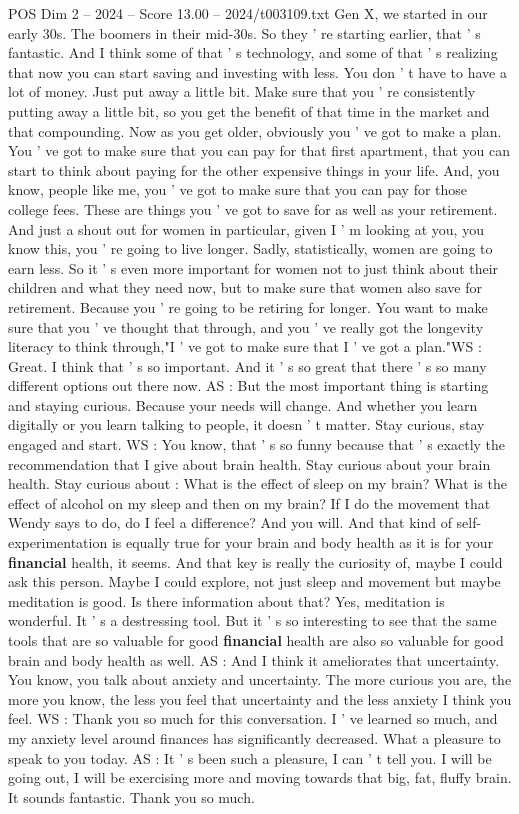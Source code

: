 \begin{textsample}{POS Dim 2 – 2024 – Score 13.00 – 2024/t003109.txt}
Gen X, we started in our early 30s.
The boomers in their mid-30s.
So they ' re starting earlier, that ' s fantastic.
And I think some of that ' s technology, and some of that ' s realizing that now you can start saving and investing with less.
You don ' t have to have a lot of money.
Just put away a little bit.
Make sure that you ' re consistently putting away a little bit, so you get the benefit of that time in the market and that compounding.
Now as you get older, obviously you ' ve got to make a plan.
You ' ve got to make sure that you can pay for that first apartment, that you can start to think about paying for the other expensive things in your life.
And, you know, people like me, you ' ve got to make sure that you can pay for those college fees.
These are things you ' ve got to save for as well as your retirement.
And just a shout out for women in particular, given I ' m looking at you, you know this, you ' re going to live longer.
Sadly, statistically, women are going to earn less.
So it ' s even more important for women not to just think about their children and what they need now, but to make sure that women also save for retirement.
Because you ' re going to be retiring for longer.
You want to make sure that you ' ve thought that through, and you ' ve really got the longevity literacy to think through,"I ' ve got to make sure that I ' ve got a plan."WS : Great.
I think that ' s so important.
And it ' s so great that there ' s so many different options out there now.
AS : But the most important thing is starting and staying curious.
Because your needs will change.
And whether you learn digitally or you learn talking to people, it doesn ' t matter.
Stay curious, stay engaged and start.
WS : You know, that ' s so funny because that ' s exactly the recommendation that I give about brain health.
Stay curious about your brain health.
Stay curious about : What is the effect of sleep on my brain?
What is the effect of alcohol on my sleep and then on my brain?
If I do the movement that Wendy says to do, do I feel a difference?
And you will.
And that kind of self-experimentation is equally true for your brain and body health as it is for your \textbf{financial} health, it seems.
And that key is really the curiosity of, maybe I could ask this person.
Maybe I could explore, not just sleep and movement but maybe meditation is good.
Is there information about that?
Yes, meditation is wonderful.
It ' s a destressing tool.
But it ' s so interesting to see that the same tools that are so valuable for good \textbf{financial} health are also so valuable for good brain and body health as well.
AS : And I think it ameliorates that uncertainty.
You know, you talk about anxiety and uncertainty.
The more curious you are, the more you know, the less you feel that uncertainty and the less anxiety I think you feel.
WS : Thank you so much for this conversation.
I ' ve learned so much, and my anxiety level around finances has significantly decreased.
What a pleasure to speak to you today.
AS : It ' s been such a pleasure, I can ' t tell you.
I will be going out, I will be exercising more and moving towards that big, fat, fluffy brain.
It sounds fantastic.
Thank you so much.


\end{textsample}
